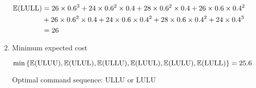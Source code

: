 \begin{prob}
\begin{enumerate}[label = {\textbf{(\greek*)}}]
\begin{sol}
\begin{enumerate}[start = 1, label = {\protect\tsc{$\mathbf{S_{\arabic*}}$}}]
$\begin{aligned}
    \mathbb E(\text{LULL}) &= 26\times 0.6^3 + 24\times 0.6^2\times 0.4 + 28\times 0.6^2\times 0.4 + 26\times 0.6\times0.4^2 \\
    &+ 26\times 0.6^2\times 0.4 + 24\times 0.6\times 0.4^2 + 28\times 0.6\times 0.4^2 + 24\times 0.4^3 \\
    &= 26
\end{aligned}$

\item Minimum expected cost

$\min\left\{\mathbb E(\text{ULUU}),\mathbb E(\text{ULUL}),\mathbb E(\text{ULLU}),\mathbb E(\text{LUUL}),\mathbb E(\text{LULU}),\mathbb E(\text{LULL})\right\}=25.6$

Optimal command sequence: $\text{ULLU}$ or $\text{LULU}$

\end{enumerate}
    \end{sol}
\end{enumerate}
\end{prob}